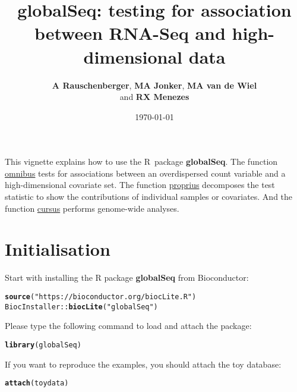 \documentclass{article}\usepackage[]{graphicx}\usepackage[]{color}
\title{globalSeq: testing for association between \mbox{RNA-Seq} and high-dimensional data}
\date{\today}
\author{\textbf{A Rauschenberger}, \textbf{MA Jonker}, \textbf{MA van de Wiel} \\ and \textbf{RX Menezes}}
\makeatletter
\newcommand{\hlstr}[1]{\textcolor[rgb]{0.192,0.494,0.8}{#1}}%
\newcommand{\hlopt}[1]{\textcolor[rgb]{0,0,0}{#1}}%
\newcommand{\hlstd}[1]{\textcolor[rgb]{0.345,0.345,0.345}{#1}}%
\newcommand{\hlkwd}[1]{\textcolor[rgb]{0.737,0.353,0.396}{\textbf{#1}}}%
\newenvironment{kframe}{%
 \def\at@end@of@kframe{}%
 \ifinner\ifhmode%
  \def\at@end@of@kframe{\end{minipage}}%
  \begin{minipage}{\columnwidth}%
 \fi\fi%
 \def\FrameCommand##1{\hskip\@totalleftmargin \hskip-\fboxsep
 \colorbox{shadecolor}{##1}\hskip-\fboxsep
     \hskip-\linewidth \hskip-\@totalleftmargin \hskip\columnwidth}%
 \MakeFramed {\advance\hsize-\width
   \@totalleftmargin\z@ \linewidth\hsize
   \@setminipage}}%
 {\par\unskip\endMakeFramed%
 \at@end@of@kframe}
\newenvironment{knitrout}{}{} %
\makeatother
\begin{document}
\maketitle

This vignette explains how to use the R~package \textbf{globalSeq}. The function \hyperref[omnibus]{\mbox{omnibus}} tests  for associations between an overdispersed count variable and a high-dimensional covariate set. The function \hyperref[proprius]{\mbox{proprius}} decomposes the test statistic to show the contributions of individual samples or covariates. And the function \hyperref[cursus]{\mbox{cursus}} performs genome-wide analyses.

\section{Initialisation}
\label{initialisation}

Start with installing the R package \textbf{globalSeq} from Bioconductor:
\begin{knitrout}
\color{fgcolor}\begin{kframe}
\begin{alltt}
\hlkwd{source}\hlstd{(}\hlstr{"https://bioconductor.org/biocLite.R"}\hlstd{)}
\hlstd{BiocInstaller}\hlopt{::}\hlkwd{biocLite}\hlstd{(}\hlstr{"globalSeq"}\hlstd{)}
\end{alltt}
\end{kframe}
\end{knitrout}

Please type the following command to load and attach the package:
\begin{knitrout}
\color{fgcolor}\begin{kframe}
\begin{alltt}
\hlkwd{library}\hlstd{(globalSeq)}
\end{alltt}
\end{kframe}
\end{knitrout}

If you want to reproduce the examples, you should attach the toy database:
\begin{knitrout}
\color{fgcolor}\begin{kframe}
\begin{alltt}
\hlkwd{attach}\hlstd{(toydata)}
\end{alltt}
\end{kframe}
\end{knitrout}
\end{document}
